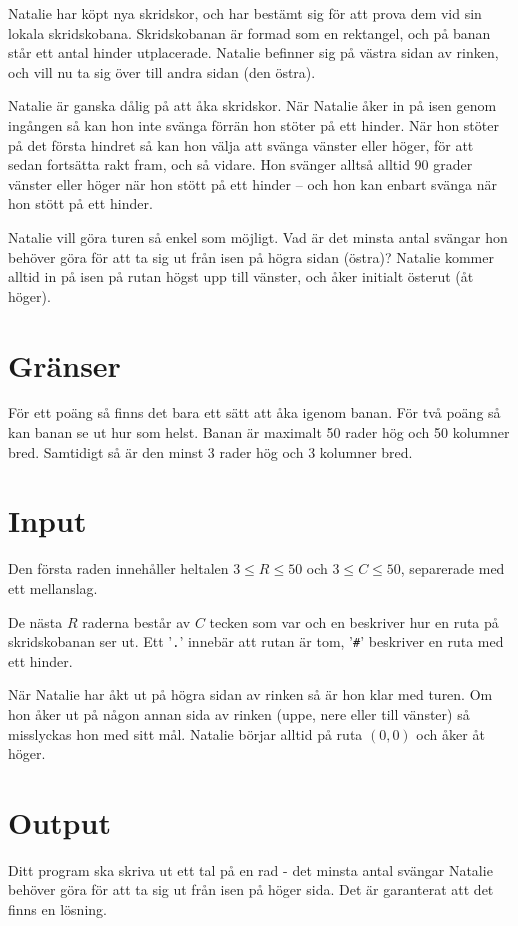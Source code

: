 Natalie har köpt nya skridskor, och har bestämt sig för att prova dem vid sin
lokala skridskobana. Skridskobanan är formad som en rektangel, och på banan
står ett antal hinder utplacerade. Natalie befinner sig på västra sidan av rinken,
och vill nu ta sig över till andra sidan (den östra).

Natalie är ganska dålig på att åka skridskor. När Natalie åker in på isen
genom ingången så kan hon inte svänga förrän hon stöter på ett hinder. När hon
stöter på det första hindret så kan hon välja att svänga vänster eller höger,
för att sedan fortsätta rakt fram, och så vidare. Hon svänger alltså alltid
90 grader vänster eller höger när hon stött på ett hinder -- och hon kan enbart svänga
när hon stött på ett hinder.

Natalie vill göra turen så enkel som möjligt. Vad är det minsta antal svängar
hon behöver göra för att ta sig ut från isen på högra sidan (östra)?
Natalie kommer alltid in på isen på rutan högst upp till vänster, och åker
initialt österut (åt höger).

\section*{Gränser}
För ett poäng så finns det bara ett sätt att åka igenom banan. För två poäng så
kan banan se ut hur som helst. Banan
är maximalt 50 rader hög och 50 kolumner bred. Samtidigt så är den minst 3 rader hög
och 3 kolumner bred.

\section*{Input}
Den första raden innehåller heltalen $3 \le R \le 50$ och $3 \le C \le 50$,
separerade med ett mellanslag.

De nästa $R$ raderna består av $C$ tecken som var och en beskriver hur en ruta
på skridskobanan ser ut. Ett '\texttt{.}' innebär att rutan är tom,
'\texttt{\#}' beskriver en ruta med ett hinder.

När Natalie har åkt ut på högra sidan av rinken så är hon klar med turen. Om hon åker
ut på någon annan sida av rinken (uppe, nere eller till vänster) så misslyckas hon med
sitt mål. Natalie börjar alltid på ruta $(0,0)$ och åker åt höger.

\section*{Output}
Ditt program ska skriva ut ett tal på en rad - det minsta antal svängar Natalie
behöver göra för att ta sig ut från isen på höger sida. Det är garanterat att
det finns en lösning.


